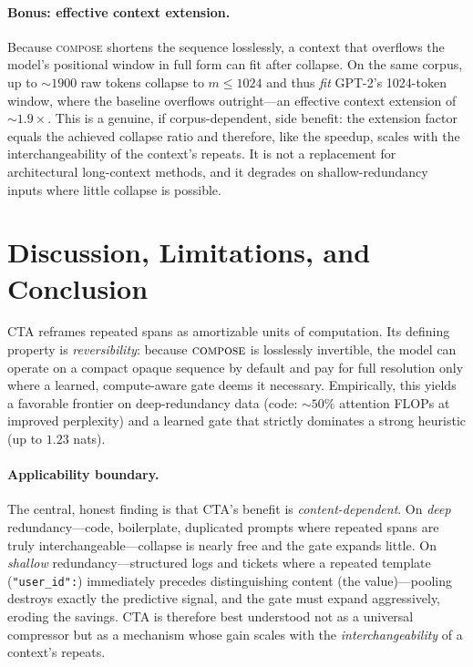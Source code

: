 \documentclass[11pt]{article}
\newcommand{\compose}{\textsc{compose}}
\begin{document}
\paragraph{Bonus: effective context extension.} Because \compose{} shortens the sequence
losslessly, a context that overflows the model's positional window in full form can fit
after collapse. On the same corpus, up to ${\sim}1900$ raw tokens collapse to $m{\le}1024$
and thus \emph{fit} GPT-2's 1024-token window, where the baseline overflows outright---an
effective context extension of ${\sim}1.9\times$. This is a genuine, if corpus-dependent,
side benefit: the extension factor equals the achieved collapse ratio and therefore, like
the speedup, scales with the interchangeability of the context's repeats. It is not a
replacement for architectural long-context methods, and it degrades on shallow-redundancy
inputs where little collapse is possible.

\section{Discussion, Limitations, and Conclusion}
\label{sec:conclusion}

CTA reframes repeated spans as amortizable units of computation. Its defining property is
\emph{reversibility}: because $\compose$ is losslessly invertible, the model can operate on
a compact opaque sequence by default and pay for full resolution only where a learned,
compute-aware gate deems it necessary. Empirically, this yields a favorable frontier on
deep-redundancy data (code: $\sim\!50\%$ attention FLOPs at improved perplexity) and a
learned gate that strictly dominates a strong heuristic (up to $1.23$ nats).

\paragraph{Applicability boundary.} The central, honest finding is that CTA's benefit is
\emph{content-dependent}. On \emph{deep} redundancy---code, boilerplate, duplicated
prompts where repeated spans are truly interchangeable---collapse is nearly free and the
gate expands little. On \emph{shallow} redundancy---structured logs and tickets where a
repeated template (\texttt{"user\_id":}) immediately precedes distinguishing content
(the value)---pooling destroys exactly the predictive signal, and the gate must expand
aggressively, eroding the savings. CTA is therefore best understood not as a universal
compressor but as a mechanism whose gain scales with the \emph{interchangeability} of a
context's repeats.
\end{document}
